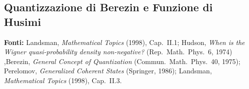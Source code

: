 \documentclass[12pt, a4paper]{article}
\newcommand{\fonti}[1]{%
	\begin{fontebox}
		\textcolor{fontecolor}{\footnotesize\textbf{Fonti:} #1}
	\end{fontebox}%
}
\begin{document}
	\subsection{Quantizzazione di Berezin e Funzione di Husimi}
	
	\fonti{Landsman, \textit{Mathematical Topics} (1998), Cap.~II.1; Hudson, \textit{When is the Wigner quasi-probability density non-negative?} (Rep.\ Math.\ Phys.\ 6, 1974) ,Berezin, \textit{General Concept of Quantization} (Commun.\ Math.\ Phys.\ 40, 1975); Perelomov, \textit{Generalized Coherent States} (Springer, 1986); Landsman, \textit{Mathematical Topics} (1998), Cap.~II.3.}
	
\end{document}
